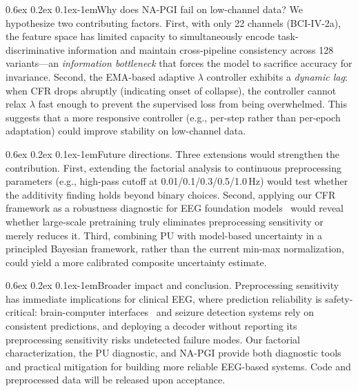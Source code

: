 \documentclass{article}
\makeatletter
\renewcommand{\paragraph}{\@startsection{paragraph}{4}{\z@}%
  {0.6ex \@plus 0.2ex \@minus 0.1ex}{-1em}{\normalsize\bf}}
\makeatother
\begin{document}
\paragraph{Why does NA-PGI fail on low-channel data?}
We hypothesize two contributing factors. First, with only 22 channels (BCI-IV-2a), the feature space has limited capacity to simultaneously encode task-discriminative information and maintain cross-pipeline consistency across 128 variants---an \emph{information bottleneck} that forces the model to sacrifice accuracy for invariance. Second, the EMA-based adaptive $\lambda$ controller exhibits a \emph{dynamic lag}: when CFR drops abruptly (indicating onset of collapse), the controller cannot relax $\lambda$ fast enough to prevent the supervised loss from being overwhelmed. This suggests that a more responsive controller (e.g., per-step rather than per-epoch adaptation) could improve stability on low-channel data.

\paragraph{Future directions.}
Three extensions would strengthen the contribution.
First, extending the factorial analysis to continuous preprocessing parameters (e.g., high-pass cutoff at 0.01/0.1/0.3/0.5/1.0\,Hz) would test whether the additivity finding holds beyond binary choices.
Second, applying our CFR framework as a robustness diagnostic for EEG foundation models~\citep{csbrain2025,neuript2025,reve2025} would reveal whether large-scale pretraining truly eliminates preprocessing sensitivity or merely reduces it.
Third, combining PU with model-based uncertainty in a principled Bayesian framework, rather than the current min-max normalization, could yield a more calibrated composite uncertainty estimate.

\paragraph{Broader impact and conclusion.}
Preprocessing sensitivity has immediate implications for clinical EEG, where prediction reliability is safety-critical: brain-computer interfaces~\citep{blankertz2007bci} and seizure detection systems rely on consistent predictions, and deploying a decoder without reporting its preprocessing sensitivity risks undetected failure modes. Our factorial characterization, the PU diagnostic, and NA-PGI provide both diagnostic tools and practical mitigation for building more reliable EEG-based systems. Code and preprocessed data will be released upon acceptance.
\end{document}
